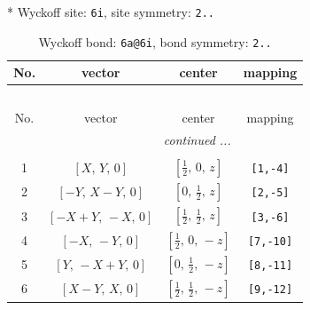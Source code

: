 \documentclass[fleqn,8pt]{jsarticle}
\begin{document}
* Wyckoff site: {\tt 6i}, site symmetry: {\tt 2..}
\renewcommand{\arraystretch}{1.2}
\begin{longtable}{cccc}
\caption{Wyckoff bond: {\tt 6a@6i}, bond symmetry: {\tt 2..}}
 \\
 \hline \hline
No. & vector & center & mapping \\ \hline \endfirsthead

\multicolumn{3}{l}{\tablename\ \thetable{}} \\
 \hline \hline
No. & vector & center & mapping \\ \hline \endhead

 \hline \hline
\multicolumn{3}{r}{\footnotesize\it continued ...} \\ \endfoot

 \hline \hline
\multicolumn{3}{r}{} \\ \endlastfoot

1 & $\left[ X,\, Y,\, 0 \right]$ & $\left[ \frac{1}{2},\, 0,\, z \right]$ & {\tt [1,-4]} \\ \hline
2 & $\left[ - Y,\, X - Y,\, 0 \right]$ & $\left[ 0,\, \frac{1}{2},\, z \right]$ & {\tt [2,-5]} \\ \hline
3 & $\left[ - X + Y,\, - X,\, 0 \right]$ & $\left[ \frac{1}{2},\, \frac{1}{2},\, z \right]$ & {\tt [3,-6]} \\ \hline
4 & $\left[ - X,\, - Y,\, 0 \right]$ & $\left[ \frac{1}{2},\, 0,\, - z \right]$ & {\tt [7,-10]} \\ \hline
5 & $\left[ Y,\, - X + Y,\, 0 \right]$ & $\left[ 0,\, \frac{1}{2},\, - z \right]$ & {\tt [8,-11]} \\ \hline
6 & $\left[ X - Y,\, X,\, 0 \right]$ & $\left[ \frac{1}{2},\, \frac{1}{2},\, - z \right]$ & {\tt [9,-12]} \\
\end{longtable}
\renewcommand{\arraystretch}{1.2}
\end{document}
